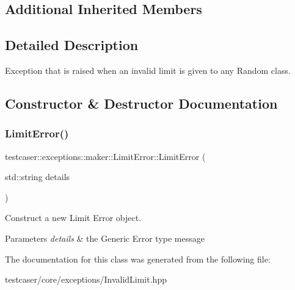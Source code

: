 \subsection*{Additional Inherited Members}


\subsection{Detailed Description}
Exception that is raised when an invalid limit is given to any Random class. 

\subsection{Constructor \& Destructor Documentation}
\mbox{\label{classtestcaser_1_1exceptions_1_1maker_1_1LimitError_a93442165f498e8910b4c2170a05d3b3a}} 
\subsubsection{\texorpdfstring{Limit\+Error()}{LimitError()}}
{\footnotesize\ttfamily testcaser\+::exceptions\+::maker\+::\+Limit\+Error\+::\+Limit\+Error (\begin{DoxyParamCaption}\item[{std\+::string}]{details }\end{DoxyParamCaption})\hspace{0.3cm}{\ttfamily [inline]}}



Construct a new Limit Error object. 


\begin{DoxyParams}{Parameters}
{\em details} & the Generic Error type message \\
\hline
\end{DoxyParams}


The documentation for this class was generated from the following file\+:\begin{DoxyCompactItemize}
\item 
testcaser/core/exceptions/Invalid\+Limit.\+hpp\end{DoxyCompactItemize}
